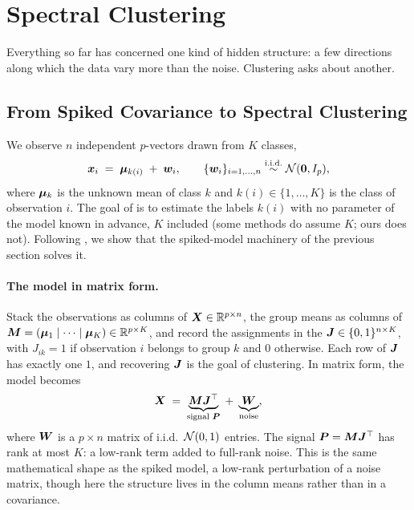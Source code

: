 
\section{Spectral Clustering}\label{sec:clustering}

Everything so far has concerned one kind of hidden structure: a few directions along which the data vary more than the noise. Clustering asks about another.

\subsection{From Spiked Covariance to Spectral Clustering}\label{subsec:clustering}

We observe \(n\) independent \(p\)-vectors drawn from \(K\) classes,
\begin{equation}
  \bm{x}_i \;=\; \bm{\mu}_{k(i)} \;+\; \bm{w}_i, \qquad \{\bm{w}_i\}_{i=1,\dots,n} \stackrel{\textnormal{i.i.d.}}{\sim} \mathcal{N}(\bm{0}, I_p),
  \label{eq:clustering-model}
\end{equation}
where \(\bm{\mu}_k\) is the unknown mean of class \(k\) and \(k(i) \in \{1, \dots, K\}\) is the class of observation \(i\). The goal of  is to estimate the labels \(k(i)\) with no parameter of the model known in advance, \(K\) included (some methods do assume \(K\); ours does not). Following \citet{LebeauChatelainCouillet2024}, we show that the spiked-model machinery of the previous section solves it.

\paragraph{The model in matrix form.}
Stack the observations as columns of \(\bm{X} \in \mathbb{R}^{p \times n}\), the group means as columns of \(\bm{M} = (\bm{\mu}_1 \mid \cdots \mid \bm{\mu}_K) \in \mathbb{R}^{p \times K}\), and record the assignments in the  \(\bm{J} \in \{0, 1\}^{n \times K}\), with \(J_{i k} = 1\) if observation \(i\) belongs to group \(k\) and \(0\) otherwise. Each row of \(\bm{J}\) has exactly one \(1\), and recovering \(\bm{J}\) is the goal of clustering. In matrix form, the model becomes
\begin{equation}
  \bm{X} \;=\; \underbrace{\bm{M} \bm{J}^{\top}}_{\text{signal } \bm{P}} \;+\; \underbrace{\bm{W}}_{\text{noise}},
  \label{eq:clustering-matrix}
\end{equation}
where \(\bm{W}\) is a \(p \times n\) matrix of i.i.d.\ \(\mathcal{N}(0, 1)\) entries. The signal \(\bm{P} = \bm{M}\bm{J}^{\top}\) has rank at most \(K\): a low-rank term added to full-rank noise. This is the same mathematical shape as the spiked model, a low-rank perturbation of a noise matrix, though here the structure lives in the column means rather than in a covariance.

